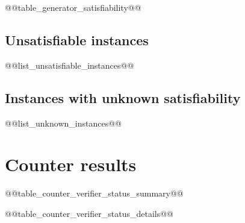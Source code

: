 \documentclass[british]{article}
\begin{document}
\begin{table}[ht]
    \begin{center}
    \caption{Satisfiability of instances generated during fuzzing.}
    \label{tab:generator-satisfiability}
@@table_generator_satisfiability@@
    \end{center}
\end{table}

\subsection{Unsatisfiable instances}
\label{subsec:unsatisfiable-instances}

@@list_unsatisfiable_instances@@


\subsection{Instances with unknown satisfiability}
\label{subsec:unknown-instances}

@@list_unknown_instances@@


\section{Counter results}
\label{sec:counter-results}

\begin{table}[ht]
    \begin{center}
    \caption{Aggregate results for counters on all the fuzzing instances. Here `agree' indicates the number of instances for which both the counter and the verifier return a model count and agree on the returned model count. The column `disagree' shows for each counter on how many instances both the counter and the verifier returned a model count, but disagreed on what that model count was. The `counter fails' column indicates on how many instances the counter failed to return a model count (due to time out, memory out, or any other error), while the verifier did successfully return a model count. The `verifier fails' column indicates for how many instances the verifier failed to return a model count, while the counter succeeded. Finally, the `both fail' column indicates for how many instances both the model counter and the verifier failed to return a model count.}
    \label{tab:counter-verifier-status-summary}
@@table_counter_verifier_status_summary@@
    \end{center}
\end{table}


\newpage
\begin{landscape}
@@table_counter_verifier_status_details@@
\end{landscape}
\end{document}
